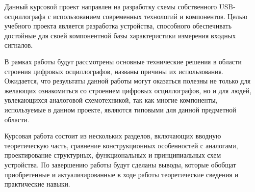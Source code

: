 Данный курсовой проект направлен на разработку схемы собственного USB-осциллографа с использованием современных технологий и компонентов. 
Целью учебного проекта является разработка устройства, способного обеспечивать достойные для своей компонентной базы характеристики измерения входных сигналов.

В рамках работы будут рассмотрены основные технические решения в области строения цифровых осциллографов, названы причины их использования. Ожидается, что результаты данной работы могут оказаться полезны не только для желающих ознакомиться со строением цифровых осциллографов, но и для людей, увлекающихся аналоговой схемотехникой, так как многие компоненты, используемые в данном проекте, являются типовыми для данной предметной области.

Курсовая работа состоит из нескольких разделов, включающих вводную теоретическую часть, сравнение конструкционных особенностей с аналогами, проектирование структурных, функциональных и принципиальных схем устройства. По завершению работы будут сделаны выводы, которые обобщат приобретенные и актуализированные в ходе работы теоретические сведения и практические навыки.
